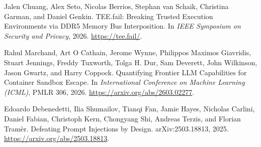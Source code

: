 Jalen Chuang, Alex Seto, Nicolas Berrios, Stephan van Schaik, Christina Garman, and Daniel Genkin.
\newblock TEE.fail: Breaking Trusted Execution Environments via DDR5 Memory Bus Interposition.
\newblock In \textit{IEEE Symposium on Security and Privacy}, 2026.
\newblock \url{https://tee.fail/}.

Rahul Marchand, Art O Cathain, Jerome Wynne, Philippos Maximos Giavridis, Stuart Jennings, Freddy Tuxworth, Tolga H. Dur, Sam Deverett, John Wilkinson, Jason Gwartz, and Harry Coppock.
\newblock Quantifying Frontier LLM Capabilities for Container Sandbox Escape.
\newblock In \textit{International Conference on Machine Learning (ICML)}, PMLR 306, 2026.
\newblock \url{https://arxiv.org/abs/2603.02277}.

Edoardo Debenedetti, Ilia Shumailov, Tianqi Fan, Jamie Hayes, Nicholas Carlini, Daniel Fabian, Christoph Kern, Chongyang Shi, Andreas Terzis, and Florian Tram\`er.
\newblock Defeating Prompt Injections by Design.
\newblock arXiv:2503.18813, 2025.
\newblock \url{https://arxiv.org/abs/2503.18813}.
